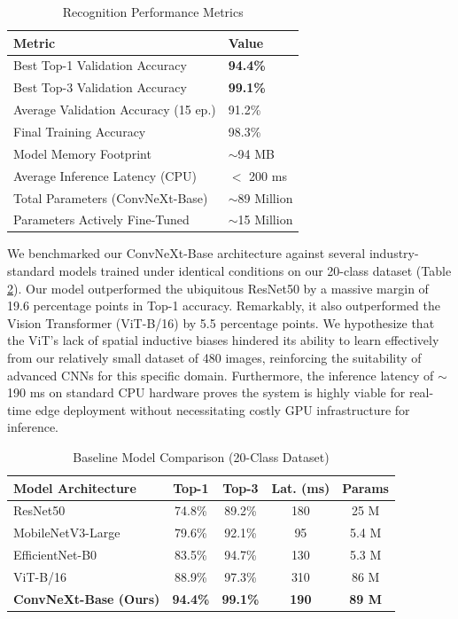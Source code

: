 \documentclass[conference]{IEEEtran}
\begin{document}
\begin{table}[htbp]
\caption{Recognition Performance Metrics}
\begin{center}
\begin{tabular}{@{}ll@{}}
\toprule
\textbf{Metric} & \textbf{Value} \\
\midrule
Best Top-1 Validation Accuracy & \textbf{94.4\%} \\
Best Top-3 Validation Accuracy & \textbf{99.1\%} \\
Average Validation Accuracy (15 ep.) & 91.2\% \\
Final Training Accuracy & 98.3\% \\
Model Memory Footprint & $\sim$94 MB \\
Average Inference Latency (CPU) & $<$ 200 ms \\
Total Parameters (ConvNeXt-Base) & $\sim$89 Million \\
Parameters Actively Fine-Tuned & $\sim$15 Million \\
\bottomrule
\end{tabular}
\label{tab:recognition_stats}
\end{center}
\end{table}

We benchmarked our ConvNeXt-Base architecture against several industry-standard models trained under identical conditions on our 20-class dataset (Table \ref{tab:baselines}). Our model outperformed the ubiquitous ResNet50 by a massive margin of 19.6 percentage points in Top-1 accuracy. Remarkably, it also outperformed the Vision Transformer (ViT-B/16) by 5.5 percentage points. We hypothesize that the ViT's lack of spatial inductive biases hindered its ability to learn effectively from our relatively small dataset of 480 images, reinforcing the suitability of advanced CNNs for this specific domain. Furthermore, the inference latency of $\sim$190 ms on standard CPU hardware proves the system is highly viable for real-time edge deployment without necessitating costly GPU infrastructure for inference.

\begin{table}[htbp]
\caption{Baseline Model Comparison (20-Class Dataset)}
\begin{center}
\begin{tabular}{@{}lcccc@{}}
\toprule
\textbf{Model Architecture} & \textbf{Top-1} & \textbf{Top-3} & \textbf{Lat. (ms)} & \textbf{Params} \\
\midrule
ResNet50 & 74.8\% & 89.2\% & 180 & 25 M \\
MobileNetV3-Large & 79.6\% & 92.1\% & 95 & 5.4 M \\
EfficientNet-B0 & 83.5\% & 94.7\% & 130 & 5.3 M \\
ViT-B/16 & 88.9\% & 97.3\% & 310 & 86 M \\
\textbf{ConvNeXt-Base (Ours)} & \textbf{94.4\%} & \textbf{99.1\%} & \textbf{190} & \textbf{89 M} \\
\bottomrule
\end{tabular}
\label{tab:baselines}
\end{center}
\end{table}
\end{document}

